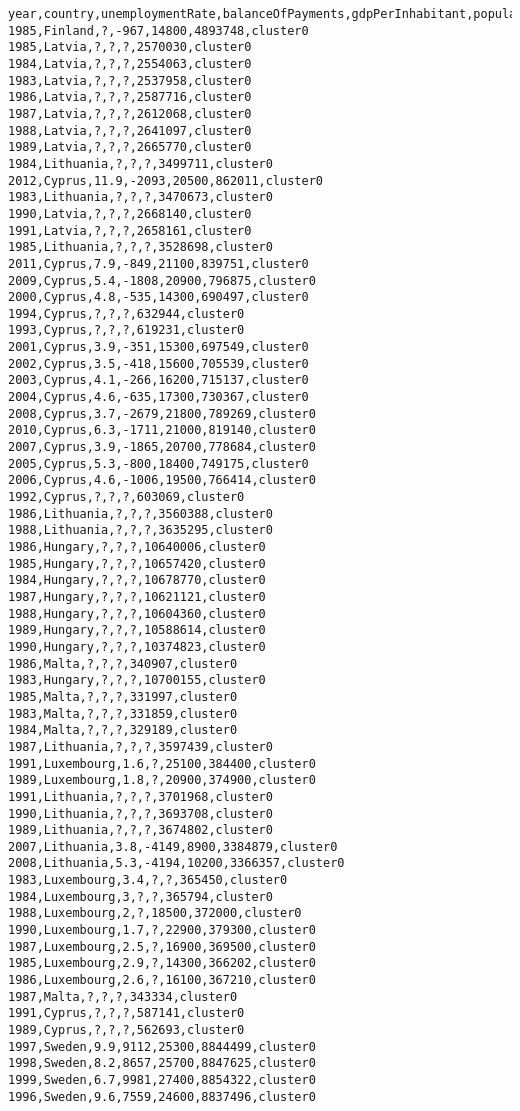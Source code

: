 \begin{lstlisting}[basicstyle=\footnotesize\ttfamily,numbers=none]
year,country,unemploymentRate,balanceOfPayments,gdpPerInhabitant,population,Cluster
1985,Finland,?,-967,14800,4893748,cluster0
1985,Latvia,?,?,?,2570030,cluster0
1984,Latvia,?,?,?,2554063,cluster0
1983,Latvia,?,?,?,2537958,cluster0
1986,Latvia,?,?,?,2587716,cluster0
1987,Latvia,?,?,?,2612068,cluster0
1988,Latvia,?,?,?,2641097,cluster0
1989,Latvia,?,?,?,2665770,cluster0
1984,Lithuania,?,?,?,3499711,cluster0
2012,Cyprus,11.9,-2093,20500,862011,cluster0
1983,Lithuania,?,?,?,3470673,cluster0
1990,Latvia,?,?,?,2668140,cluster0
1991,Latvia,?,?,?,2658161,cluster0
1985,Lithuania,?,?,?,3528698,cluster0
2011,Cyprus,7.9,-849,21100,839751,cluster0
2009,Cyprus,5.4,-1808,20900,796875,cluster0
2000,Cyprus,4.8,-535,14300,690497,cluster0
1994,Cyprus,?,?,?,632944,cluster0
1993,Cyprus,?,?,?,619231,cluster0
2001,Cyprus,3.9,-351,15300,697549,cluster0
2002,Cyprus,3.5,-418,15600,705539,cluster0
2003,Cyprus,4.1,-266,16200,715137,cluster0
2004,Cyprus,4.6,-635,17300,730367,cluster0
2008,Cyprus,3.7,-2679,21800,789269,cluster0
2010,Cyprus,6.3,-1711,21000,819140,cluster0
2007,Cyprus,3.9,-1865,20700,778684,cluster0
2005,Cyprus,5.3,-800,18400,749175,cluster0
2006,Cyprus,4.6,-1006,19500,766414,cluster0
1992,Cyprus,?,?,?,603069,cluster0
1986,Lithuania,?,?,?,3560388,cluster0
1988,Lithuania,?,?,?,3635295,cluster0
1986,Hungary,?,?,?,10640006,cluster0
1985,Hungary,?,?,?,10657420,cluster0
1984,Hungary,?,?,?,10678770,cluster0
1987,Hungary,?,?,?,10621121,cluster0
1988,Hungary,?,?,?,10604360,cluster0
1989,Hungary,?,?,?,10588614,cluster0
1990,Hungary,?,?,?,10374823,cluster0
1986,Malta,?,?,?,340907,cluster0
1983,Hungary,?,?,?,10700155,cluster0
1985,Malta,?,?,?,331997,cluster0
1983,Malta,?,?,?,331859,cluster0
1984,Malta,?,?,?,329189,cluster0
1987,Lithuania,?,?,?,3597439,cluster0
1991,Luxembourg,1.6,?,25100,384400,cluster0
1989,Luxembourg,1.8,?,20900,374900,cluster0
1991,Lithuania,?,?,?,3701968,cluster0
1990,Lithuania,?,?,?,3693708,cluster0
1989,Lithuania,?,?,?,3674802,cluster0
2007,Lithuania,3.8,-4149,8900,3384879,cluster0
2008,Lithuania,5.3,-4194,10200,3366357,cluster0
1983,Luxembourg,3.4,?,?,365450,cluster0
1984,Luxembourg,3,?,?,365794,cluster0
1988,Luxembourg,2,?,18500,372000,cluster0
1990,Luxembourg,1.7,?,22900,379300,cluster0
1987,Luxembourg,2.5,?,16900,369500,cluster0
1985,Luxembourg,2.9,?,14300,366202,cluster0
1986,Luxembourg,2.6,?,16100,367210,cluster0
1987,Malta,?,?,?,343334,cluster0
1991,Cyprus,?,?,?,587141,cluster0
1989,Cyprus,?,?,?,562693,cluster0
1997,Sweden,9.9,9112,25300,8844499,cluster0
1998,Sweden,8.2,8657,25700,8847625,cluster0
1999,Sweden,6.7,9981,27400,8854322,cluster0
1996,Sweden,9.6,7559,24600,8837496,cluster0

\end{lstlisting}
